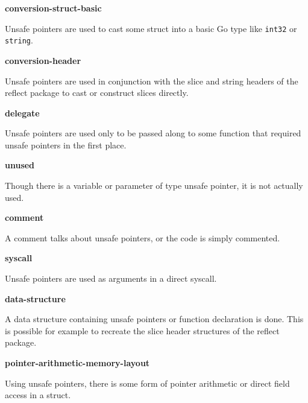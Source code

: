


\textbf{conversion-struct-basic}

Unsafe pointers are used to cast some struct into a basic Go type like \texttt{int32} or \texttt{string}.




\textbf{conversion-header}

Unsafe pointers are used in conjunction with the slice and string headers of the reflect package to cast or construct
slices directly.




\textbf{delegate}

Unsafe pointers are used only to be passed along to some function that required unsafe pointers in the first place.




\textbf{unused}

Though there is a variable or parameter of type unsafe pointer, it is not actually used.




\textbf{comment}

A comment talks about unsafe pointers, or the code is simply commented.




\textbf{syscall}

Unsafe pointers are used as arguments in a direct syscall.




\textbf{data-structure}

A data structure containing unsafe pointers or function declaration is done.
This is possible for example to recreate the slice header structures of the reflect package.




\textbf{pointer-arithmetic-memory-layout}

Using unsafe pointers, there is some form of pointer arithmetic or direct field access in a struct.

